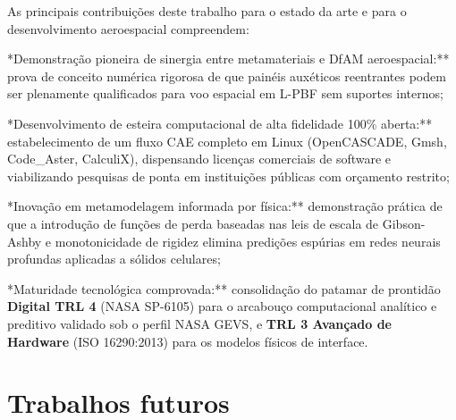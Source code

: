 As principais contribuições deste trabalho para o estado da arte e para o desenvolvimento aeroespacial compreendem:
\begin{alineas}
  \item **Demonstração pioneira de sinergia entre metamateriais e DfAM aeroespacial:** prova de conceito numérica rigorosa de que painéis auxéticos reentrantes podem ser plenamente qualificados para voo espacial em L-PBF sem suportes internos;
  \item **Desenvolvimento de esteira computacional de alta fidelidade 100\% aberta:** estabelecimento de um fluxo CAE completo em Linux (OpenCASCADE, Gmsh, Code\_Aster, CalculiX), dispensando licenças comerciais de software e viabilizando pesquisas de ponta em instituições públicas com orçamento restrito;
  \item **Inovação em metamodelagem informada por física:** demonstração prática de que a introdução de funções de perda baseadas nas leis de escala de Gibson-Ashby e monotonicidade de rigidez elimina predições espúrias em redes neurais profundas aplicadas a sólidos celulares;
  \item **Maturidade tecnológica comprovada:** consolidação do patamar de prontidão \textbf{Digital TRL 4} (NASA SP-6105) para o arcabouço computacional analítico e preditivo validado sob o perfil NASA GEVS, e \textbf{TRL 3 Avançado de Hardware} (ISO 16290:2013) para os modelos físicos de interface.
\end{alineas}

\section{Trabalhos futuros}
\label{sec:conc-trabalhos-futuros}

